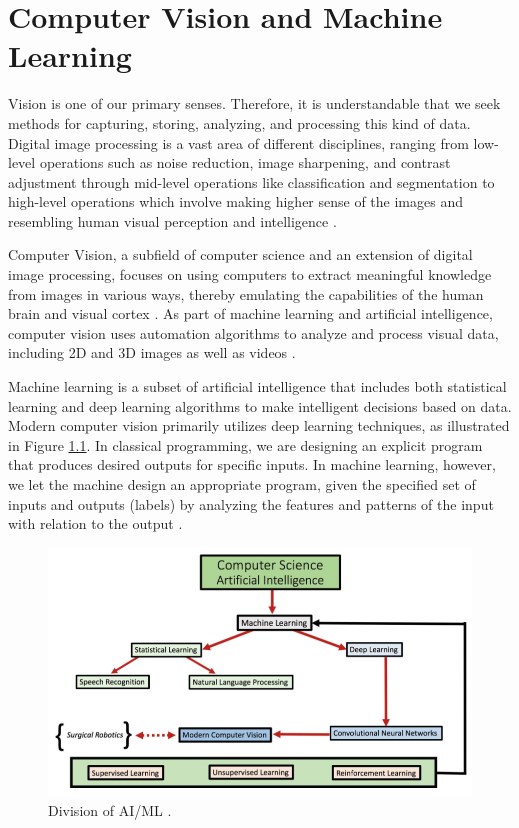 \chapter{Computer Vision and Machine Learning}
\label{chapter:cv}

Vision is one of our primary senses. Therefore, it is understandable that we seek methods for capturing, storing, analyzing, and processing this kind of data. Digital image processing is a vast area of different disciplines, ranging from low-level operations such as noise reduction, image sharpening, and contrast adjustment through mid-level operations like classification and segmentation to high-level operations which involve making higher sense of the images and resembling human visual perception and intelligence \cite{Gonzalez2018}. 

Computer Vision, a subfield of computer science and an extension of digital image processing, focuses on using computers to extract meaningful knowledge from images in various ways, thereby emulating the capabilities of the human brain and visual cortex \cite{Gonzalez2018}. As part of machine learning and artificial intelligence, computer vision uses automation algorithms to analyze and process visual data, including 2D and 3D images as well as videos \cite{Szeliski2022, Atallah2020}.

Machine learning is a subset of artificial intelligence that includes both statistical learning and deep learning algorithms to make intelligent decisions based on data. Modern computer vision primarily utilizes deep learning techniques, as illustrated in Figure \ref{fig:ai-ml}. In classical programming, we are designing an explicit program that produces desired outputs for specific inputs. In machine learning, however, we let the machine design an appropriate program, given the specified set of inputs and outputs (labels) by analyzing the features and patterns of the input with relation to the output \cite{Alam2021}.

\begin{figure}[H]
\begin{centering}
\includegraphics[width=12cm]{assets/images/aiml.png}
\par\end{centering}
\caption{Division of AI/ML \cite{Atallah2020}.}
\label{fig:ai-ml}
\end{figure}

